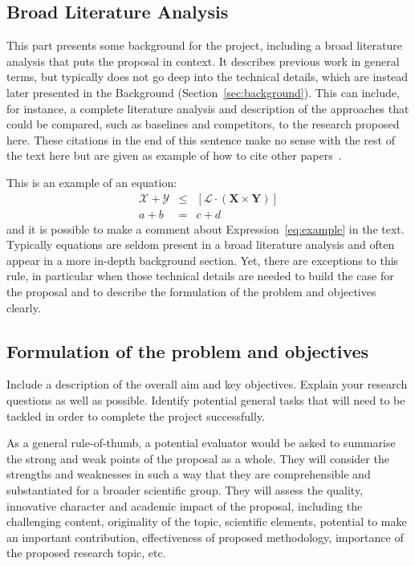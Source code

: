 \documentclass{article}
\newcommand{\cX}{\mathcal{X}}
\newcommand{\cL}{\mathcal{L}}
\newcommand{\cY}{\mathcal{Y}}
\newcommand{\bX}{\mathbf{X}}
\newcommand{\bY}{\mathbf{Y}}
\begin{document}
\subsection{Broad Literature Analysis}\label{sec:broadliterature}

This part presents some background for the project, including a broad literature analysis that puts the proposal in context. It describes previous work in general terms, but typically does not go deep into the technical details, which are instead later presented in the Background (Section~\ref{sec:background}). This can include, for instance, a complete literature analysis and description of the approaches that could be compared, such as baselines and competitors, to the research proposed here. These citations in the end of this sentence make no sense with the rest of the text here but are given as example of how to cite other papers~\citep{al2019predicting,alotaibi2020applications}.

This is an example of an equation:
\begin{eqnarray}
    \label{eq:example}
    \cX + \cY & \leq & \left[ \cL \cdot (\bX \times \bY) \right]\\
    a + b & = & c + d \nonumber
\end{eqnarray}
\noindent
and it is possible to make a comment about Expression~\eqref{eq:example} in the text. Typically equations are seldom present in a broad literature analysis and often appear in a more in-depth background section. Yet, there are exceptions to this rule, in particular when those technical details are needed to build the case for the proposal and to describe the formulation of the problem and objectives clearly.

\subsection{Formulation of the problem and objectives}

Include a description of the overall aim and key objectives. Explain your research questions as well as possible. Identify potential general tasks that will need to be tackled in order to complete the project successfully.

As a general rule-of-thumb, a potential evaluator would be asked to summarise the strong and weak points of the proposal as a whole. They will consider the strengths and weaknesses in such a way that they are comprehensible and substantiated for a broader scientific group. They will assess the quality, innovative character and academic impact of the proposal, including the challenging content, originality of the topic, scientific elements, potential to make an important contribution, effectiveness of proposed methodology, importance of the proposed research topic, etc.
\end{document}
